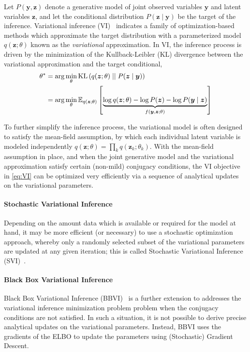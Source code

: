 \documentclass[11pt]{article}
\begin{document}
Let $P(\bm y, \bm z)$ denote a generative model of joint observed variables
$\bm y$ and latent variables $\bm z$, and let the conditional distribution
$P(\bm z\mid \bm y)$ be the target of the inference.  Variational inference
(VI)~\cite{blei_variational_2017} indicates a family of optimization-based
methods which approximate the target distribution with a parameterized model
$q(\bm z; \theta)$ known as the \emph{variational} approximation. In VI, the
inference process is driven by the minimization of the Kullback-Leibler (KL)
divergence between the variational approximation and the target conditional,
%
\begin{align}
  \theta^* &= \arg\min_\theta {\operatorname{KL}}\left( q(\bm z; \theta) \mid\mid P(\bm z\mid
  \bm y) \right) \\
  &= \arg\min_\theta {\mathbb{E}}_{q(\bm z; \theta)}\left[ \underbrace{ \log q(\bm z;
  \theta) - \log P(\bm z) -\log P(\bm y\mid \bm z) }_{f(\bm y, \bm z; \theta)}
  \right] \label{eq:VI}
\end{align}


To further simplify the inference process, the variational model is often
designed to satisfy the mean-field assumption, by which each individual latent
variable is modeled independently $q(\bm z; \theta) = \prod_k q(\bm z_k;
\theta_k)$.  With the mean-field assumption in place, and when the joint
generative model and the variational approximation satisfy certain (non-mild)
conjugacy conditions, the VI objective in \cref{eq:VI} can be optimized very
efficiently via a sequence of analytical updates on the variational parameters.

\paragraph{Stochastic Variational Inference}  Depending on the amount data
which is available or required for the model at hand, it may be more efficient
(or necessary) to use a stochastic optimization approach, whereby only
a randomly selected subset of the variational parameters are updated at any
given iteration; this is called Stochastic Variational Inference
(SVI)~\cite{hoffman_stochastic_2013}.

\paragraph{Black Box Variational Inference}  Black Box Variational Inference
(BBVI)~\cite{ranganath_black_2014} is a further extension to addresses the
variational inference minimization problem problem when the conjugacy
conditions are not satisfied.  In such a situation, it is not possible to
derive precise analytical updates on the variational parameters.  Instead, BBVI
uses the gradients of the ELBO to update the parameters using (Stochastic)
Gradient Descent.
\end{document}
